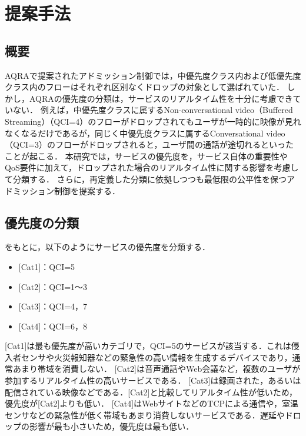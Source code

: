 \documentclass[a4paper,10pt,twocolumn,uplatex]{jsarticle}
\begin{document}
\section{提案手法}

\subsection{概要}
AQRAで提案されたアドミッション制御では，中優先度クラス内および低優先度クラス内のフローはそれぞれ区別なくドロップの対象として選ばれていた．
しかし，AQRAの優先度の分類は，サービスのリアルタイム性を十分に考慮できていない．
例えば，中優先度クラスに属するNon-conversational video（Buffered Streaming）（QCI=4）のフローがドロップされてもユーザが一時的に映像が見れなくなるだけであるが，同じく中優先度クラスに属するConversational video（QCI=3）のフローがドロップされると，ユーザ間の通話が途切れるといったことが起こる．
本研究では，サービスの優先度を，サービス自体の重要性やQoS要件に加えて，ドロップされた場合のリアルタイム性に関する影響を考慮して分類する．
さらに，再定義した分類に依拠しつつも最低限の公平性を保つアドミッション制御を提案する．\par

\subsection{優先度の分類}\label{Priority}
をもとに，以下のようにサービスの優先度を分類する．\par
\begin{itemize}
  \item $[$Cat1$]$：QCI=5
  \item $[$Cat2$]$：QCI=1〜3
  \item $[$Cat3$]$：QCI=4，7
  \item $[$Cat4$]$：QCI=6，8
\end{itemize}

[Cat1]は最も優先度が高いカテゴリで，QCI=5のサービスが該当する．これは侵入者センサや火災報知器などの緊急性の高い情報を生成するデバイスであり，通常あまり帯域を消費しない．
[Cat2]は音声通話やWeb会議など，複数のユーザが参加するリアルタイム性の高いサービスである．
[Cat3]は録画された，あるいは配信されている映像などである．[Cat2]と比較してリアルタイム性が低いため，優先度が[Cat2]よりも低い．
[Cat4]はWebサイトなどのTCPによる通信や，室温センサなどの緊急性が低く帯域もあまり消費しないサービスである．遅延やドロップの影響が最も小さいため，優先度は最も低い．
\end{document}

